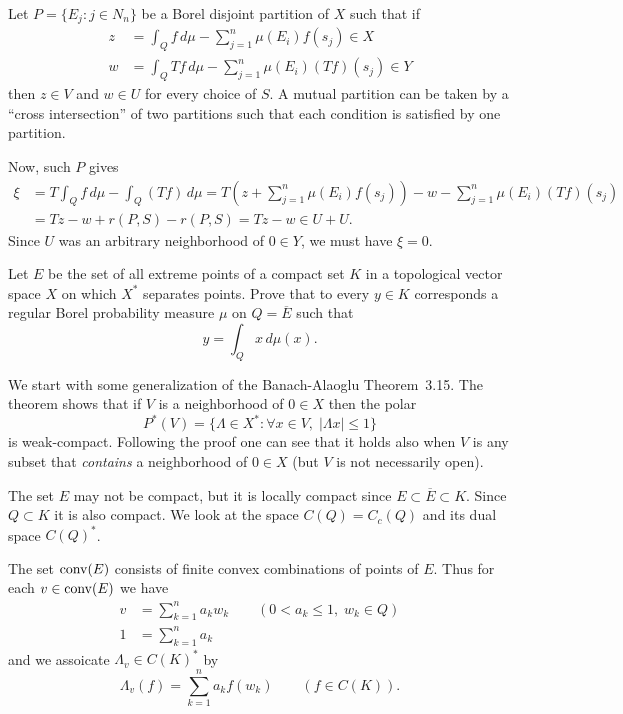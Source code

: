 \begin{enumerate}
Let \(P = \{E_j: j \in N_n\}\) be a Borel disjoint partition of $X$ such that if
\begin{align*}
z &= \int_Q f\,d\mu - \sum_{j=1}^n \mu(E_i)f(s_j) \in X \\
w &= \int_Q Tf\,d\mu - \sum_{j=1}^n \mu(E_i)(Tf)(s_j) \in Y
\end{align*}
then \(z \in V\) and \(w \in U\) for every choice of $S$.
A mutual partition can be taken by a ``cross intersection'' of two partitions
such that each condition is satisfied by one partition.

Now, such $P$ gives
\begin{align*}
\xi
&= T\int_Q f\,d\mu - \int_Q (Tf)\,d\mu
 = T\left(z + \sum_{j=1}^n \mu(E_i)f(s_j)\right) 
   - w - \sum_{j=1}^n \mu(E_i)(Tf)(s_j) \\
&= Tz - w + r(P,S) - r(P,S) = Tz - w \in U + U.
\end{align*}
Since $U$ was an arbitrary neighborhood of \(0 \in Y\), we must have \(\xi = 0\).


\begin{excopy}
Let $E$ be the set of all extreme points of a compact set $K$ in a topological
vector space $X$ on which \(X^*\) separates points.
Prove that to every \(y \in K\) corresponds a regular Borel probability measure
\(\mu\) on \(Q = \overline{E}\) such that
\begin{equation*}
y = \int_Q x\,d\mu(x).
\end{equation*}
\end{excopy}

We start with some generalization of 
the 
Banach-Alaoglu
 Theorem~3.15.
The theorem
 shows that
if $V$ is a neighborhood of \(0\in X\) then the polar
\begin{equation}  \label{eq:polar:sup:nbd}
P^*(V) = \{\Lambda \in X^*: \forall x\in V,\;|\Lambda x| \leq 1 \}
\end{equation}
is weak\upstar-compact.
Following the proof one can see that it holds also when
$V$ is any subset that \emph{contains} a neighborhood of \(0\in X\)
(but $V$ is not necessarily open).


The set $E$ may not be compact, but it is locally compact
since \(E \subset \overline{E} \subset K\).
Since  \(Q \subset K\) it is also compact.
We look at the space \(C(Q) = C_c(Q)\) and its dual space \(C(Q)^*\).

The set \(\mathop{\rm conv}\nolimits(E)\) consists of finite convex combinations of points of $E$.
Thus for each \(v \in \mathop{\rm conv}\nolimits(E)\) we have
\begin{align*}
v &= \sum_{k=1}^n a_k w_k \qquad (0 < a_k \leq 1, \; w_k \in Q) \\
1 &= \sum_{k=1}^n  a_k
\end{align*}
and we assoicate \(\Lambda_v \in C(K)^*\) by
\begin{equation*}
\Lambda_v (f) = \sum_{k=1}^n a_k f(w_k) \qquad (f \in C(K)).
\end{equation*}


\end{enumerate}
